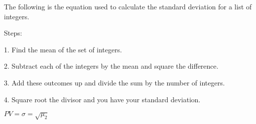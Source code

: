 \documentclass[a4paper,12pt]{article}
\begin{document}
\begin{description}
\item {The following is the equation used to calculate the standard deviation for a list of integers.}
\item {Steps:}
\item {1. Find the mean of the set of integers.}
\item {2. Subtract each of the integers by the mean and square the difference.}
\item {3. Add these outcomes up and divide the sum by the number of integers.}
\item {4. Square root the divisor and you have your standard deviation.}
\end{description}
$PV = \sigma = \sqrt {\mu _2 }$
\end{document}
